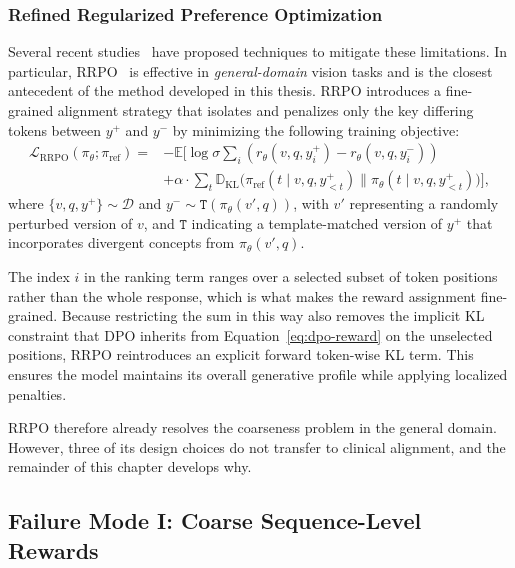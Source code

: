 \subsubsection{Refined Regularized Preference Optimization}

Several recent studies~\cite{sarkar2025self, gu2025mask, zeng2024token, zhu2025tgdpo} have proposed techniques to mitigate these limitations. In particular, RRPO~\cite{sarkar2025self} is effective in \textit{general-domain} vision tasks and is the closest antecedent of the method developed in this thesis. RRPO introduces a fine-grained alignment strategy that isolates and penalizes only the key differing tokens between $y^+$ and $y^-$ by minimizing the following training objective:
\begin{equation}\label{eq:rrpo}
\begin{split}
\mathcal{L}_{\text{RRPO}}(\pi_{\theta};\pi_{\text{ref}}) = &
-\mathbb{E}
\biggl[
\log \sigma \sum_{i} \left(r_\theta(v,q,y^+_i) - r_\theta(v,q,y^-_i)\right) \\
& + \alpha \cdot \sum_{t} \mathbb{D}_{\text{KL}} \big(\pi_{\text{ref}}(t \mid v,q,y^+_{<t}) \parallel \pi_\theta(t \mid v,q,y^+_{<t}) \big)
\biggr],
\end{split}
\end{equation}
where $\{v, q, y^+\} \sim \mathcal{D}$ and $y^- \sim \texttt{T}(\pi_\theta(v', q))$, with $v'$ representing a randomly perturbed version of $v$, and $\texttt{T}$ indicating a template-matched version of $y^+$ that incorporates divergent concepts from $\pi_\theta(v', q)$.

The index $i$ in the ranking term ranges over a selected subset of token positions rather than the whole response, which is what makes the reward assignment fine-grained. Because restricting the sum in this way also removes the implicit KL constraint that DPO inherits from Equation~\ref{eq:dpo-reward} on the unselected positions, RRPO reintroduces an explicit forward token-wise KL term. This ensures the model maintains its overall generative profile while applying localized penalties.

RRPO therefore already resolves the coarseness problem in the general domain. However, three of its design choices do not transfer to clinical alignment, and the remainder of this chapter develops why.

\subsection{Failure Mode I: Coarse Sequence-Level Rewards}
\label{sec:ana:coarse}

